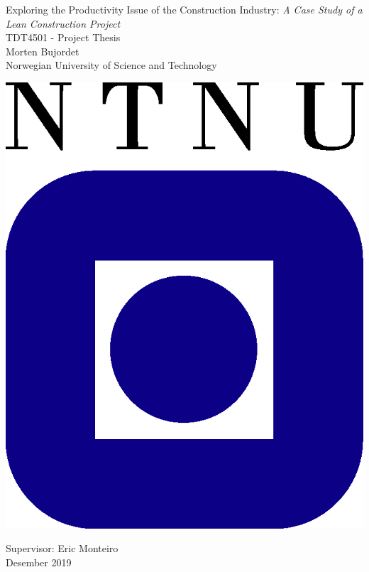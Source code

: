 \clearpage
\begin{titlepage}
    \begin{center}
    
        {\Huge Exploring the Productivity Issue of the Construction Industry:} {\Huge\textit{A Case Study of a Lean Construction Project}} \\[0.4cm]
    
        {\Large TDT4501 - Project Thesis} \\[2.0cm]
        {\Large Morten Bujordet} \\ [0.5cm]
        {\Large Norwegian University of Science and Technology}\\
    
        \vspace{3.0cm}
    
                \includegraphics{fig/ntnu-logo2.png}
    
        \vspace{3.0cm}
    
        {\Large Supervisor: Eric Monteiro} \\ [0.2cm]
        {\Large Desember 2019} \\[0.2cm]
    \end{center}
\end{titlepage}
\cleardoublepage